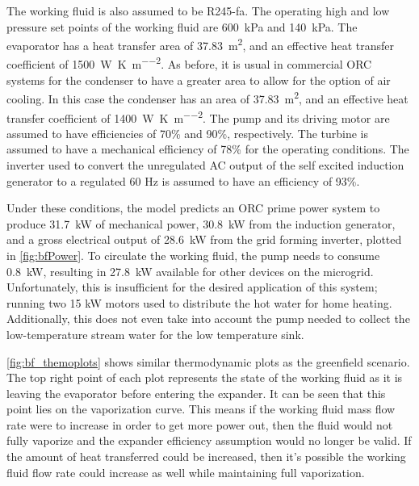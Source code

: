 The working fluid is also assumed to be R245-fa. The operating high and low pressure set points of the working fluid are \SI{600}{\kilo\pascal} and \SI{140}{\kilo\pascal}. The evaporator has a heat transfer area of \SI{37.83}{\meter\squared}, and an effective heat transfer coefficient of \SI{1500}{\watt\per\kelvin\per\meter\squared}. As before, it is usual in commercial ORC systems for the condenser to have a greater area to allow for the option of air cooling. In this case the condenser has an area of \SI{37.83}{\meter\squared}, and an effective heat transfer coefficient of \SI{1400}{\watt\per\kelvin\per\meter\squared}. The pump and its driving motor are assumed to have efficiencies of 70\% and 90\%, respectively. The turbine is assumed to have a mechanical efficiency of 78\% for the operating conditions.
The inverter used to convert the unregulated AC output of the self excited induction generator to a regulated 60 Hz is assumed to have an efficiency of 93\%.

Under these conditions, the model predicts an ORC prime power system to produce \SI{31.7}{\kilo\watt} of mechanical power, \SI{30.8}{\kilo\watt} from the induction generator, and a gross electrical output of \SI{28.6}{\kilo\watt} from the grid forming inverter, plotted in \autoref{fig:bfPower}. To circulate the working fluid, the pump needs to consume \SI{0.8}{\kilo\watt}, resulting in \SI{27.8}{\kilo\watt} available for other devices on the microgrid. Unfortunately, this is insufficient for the desired application of this system;  running two 15 kW motors used to distribute the hot water for home heating. Additionally, this does not even take into account the pump needed to collect the low-temperature stream water for the low temperature sink.


\autoref{fig:bf_themoplots} shows similar thermodynamic plots as the greenfield scenario. The top right point of each plot represents the state of the working fluid as it is leaving the evaporator before entering the expander. It can be seen that this point lies on the vaporization curve. This means if the working fluid mass flow rate were to increase in order to get more power out, then the fluid would not fully vaporize and the expander efficiency assumption would no longer be valid.
If the amount of heat transferred could be increased, then it's possible the working fluid flow rate could increase as well while maintaining full vaporization. 


\cleardoublepage